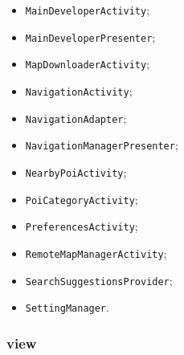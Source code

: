 \documentclass[../DefinizioneDiProdotto.tex]{subfiles}
\begin{document}
\begin{itemize}
\begin{itemize}
\item \texttt{MainDeveloperActivity};

\item \texttt{MainDeveloperPresenter};

\item \texttt{MapDownloaderActivity};

\item \texttt{NavigationActivity};

\item \texttt{NavigationAdapter};

\item \texttt{NavigationManagerPresenter};

\item \texttt{NearbyPoiActivity};

\item \texttt{PoiCategoryActivity};

\item \texttt{PreferencesActivity};

\item \texttt{RemoteMapManagerActivity};

\item \texttt{SearchSuggestionsProvider};

\item \texttt{SettingManager}.

\end{itemize}
\end{itemize}

\subsubsection{view}
\end{document}
